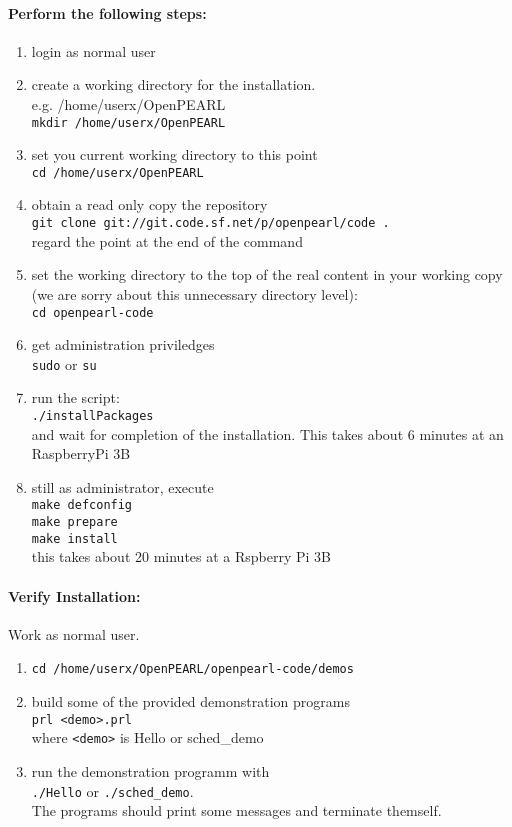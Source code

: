 \documentclass[oneside,10pt]{scrbook}
\begin{document}
\paragraph{Perform the following steps:}
\begin{enumerate}
\item login as normal user
\item create a working directory for the installation. \\
   e.g. /home/userx/OpenPEARL\\
    \verb|mkdir /home/userx/OpenPEARL|
\item set you current working directory to this point \\
    \verb|cd /home/userx/OpenPEARL|
\item obtain a read only copy the repository\\
    \verb|git clone git://git.code.sf.net/p/openpearl/code .|\\
    regard the point at the end of the command
\item set the working directory to the top of the real content
     in your working copy 
     (we are sorry about this unnecessary directory level): \\
    \verb|cd openpearl-code|
\item get administration priviledges\\
    \verb|sudo| or \verb|su|
\item run the script:\\
    \verb|./installPackages|\\
    and wait for completion of the installation.
    This takes about 6 minutes at an RaspberryPi 3B
\item still as administrator, execute\\
    \verb|make defconfig|\\
    \verb|make prepare|\\
    \verb|make install|\\
    this takes about 20 minutes at a Rspberry Pi 3B
\end{enumerate}

\paragraph{Verify Installation:}
Work as normal user.


\begin{enumerate}
\item \verb|cd /home/userx/OpenPEARL/openpearl-code/demos|
\item build some of the provided demonstration programs\\
   \verb|prl <demo>.prl|\\
   where \verb|<demo>| is Hello or sched\_demo
\item run the demonstration programm with \\
   \verb|./Hello| or \verb|./sched_demo|.\\
   The programs should print some messages and terminate themself.
\end{enumerate}
\end{document}
